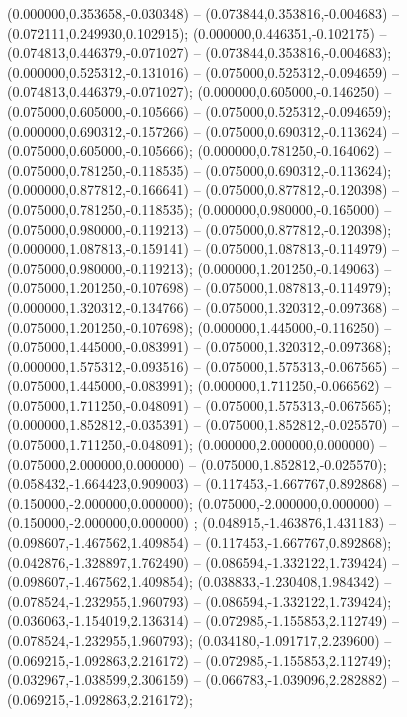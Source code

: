  (0.000000,0.353658,-0.030348) -- (0.073844,0.353816,-0.004683) -- (0.072111,0.249930,0.102915);
 (0.000000,0.446351,-0.102175) -- (0.074813,0.446379,-0.071027) -- (0.073844,0.353816,-0.004683);
 (0.000000,0.525312,-0.131016) -- (0.075000,0.525312,-0.094659) -- (0.074813,0.446379,-0.071027);
 (0.000000,0.605000,-0.146250) -- (0.075000,0.605000,-0.105666) -- (0.075000,0.525312,-0.094659);
 (0.000000,0.690312,-0.157266) -- (0.075000,0.690312,-0.113624) -- (0.075000,0.605000,-0.105666);
 (0.000000,0.781250,-0.164062) -- (0.075000,0.781250,-0.118535) -- (0.075000,0.690312,-0.113624);
 (0.000000,0.877812,-0.166641) -- (0.075000,0.877812,-0.120398) -- (0.075000,0.781250,-0.118535);
 (0.000000,0.980000,-0.165000) -- (0.075000,0.980000,-0.119213) -- (0.075000,0.877812,-0.120398);
 (0.000000,1.087813,-0.159141) -- (0.075000,1.087813,-0.114979) -- (0.075000,0.980000,-0.119213);
 (0.000000,1.201250,-0.149063) -- (0.075000,1.201250,-0.107698) -- (0.075000,1.087813,-0.114979);
 (0.000000,1.320312,-0.134766) -- (0.075000,1.320312,-0.097368) -- (0.075000,1.201250,-0.107698);
 (0.000000,1.445000,-0.116250) -- (0.075000,1.445000,-0.083991) -- (0.075000,1.320312,-0.097368);
 (0.000000,1.575312,-0.093516) -- (0.075000,1.575313,-0.067565) -- (0.075000,1.445000,-0.083991);
 (0.000000,1.711250,-0.066562) -- (0.075000,1.711250,-0.048091) -- (0.075000,1.575313,-0.067565);
 (0.000000,1.852812,-0.035391) -- (0.075000,1.852812,-0.025570) -- (0.075000,1.711250,-0.048091);
 (0.000000,2.000000,0.000000) -- (0.075000,2.000000,0.000000) -- (0.075000,1.852812,-0.025570);
 (0.058432,-1.664423,0.909003) -- (0.117453,-1.667767,0.892868) -- (0.150000,-2.000000,0.000000);
 (0.075000,-2.000000,0.000000) -- (0.150000,-2.000000,0.000000) ;
 (0.048915,-1.463876,1.431183) -- (0.098607,-1.467562,1.409854) -- (0.117453,-1.667767,0.892868);
 (0.042876,-1.328897,1.762490) -- (0.086594,-1.332122,1.739424) -- (0.098607,-1.467562,1.409854);
 (0.038833,-1.230408,1.984342) -- (0.078524,-1.232955,1.960793) -- (0.086594,-1.332122,1.739424);
 (0.036063,-1.154019,2.136314) -- (0.072985,-1.155853,2.112749) -- (0.078524,-1.232955,1.960793);
 (0.034180,-1.091717,2.239600) -- (0.069215,-1.092863,2.216172) -- (0.072985,-1.155853,2.112749);
 (0.032967,-1.038599,2.306159) -- (0.066783,-1.039096,2.282882) -- (0.069215,-1.092863,2.216172);
